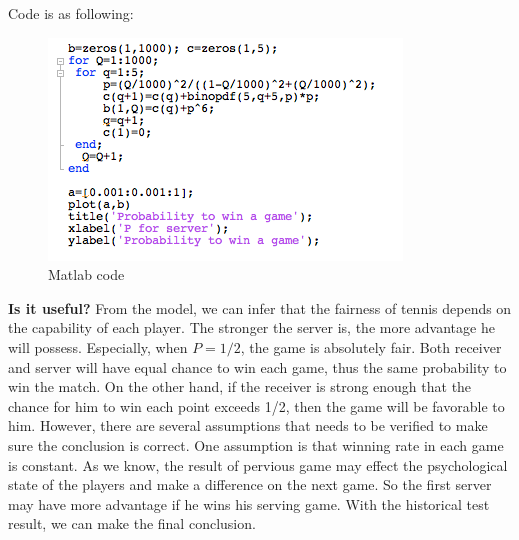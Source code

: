 \documentclass[12pt]{article}
\begin{document}
Code is as following:
\begin{figure}[h]
    \begin{center}
        \includegraphics[scale=0.6]{code.png}
    \end{center}
    \caption{Matlab code}
    \label{fig:branch}
\end{figure}

\noindent\textbf{Is it useful?} \cite{IMM1978} 
From the model, we can infer that the fairness of tennis depends on the capability of each player. The stronger the server is, the more advantage he will possess. Especially, when $P=1/2$, the game is absolutely fair. Both receiver and server will have equal chance to win each game, thus the same probability to win the match. On the other hand, if the receiver is strong enough that the chance for him to win each point exceeds 1/2, then the game will be favorable to him. However, there are several assumptions that needs to be verified to make sure the conclusion is correct. One assumption is that winning rate in each game is constant. As we know, the result of pervious game may effect the psychological state of the players and make a difference on the next game. So the first server may have more advantage if he wins his serving game. With the historical test result, we can make the final conclusion.



\end{document}
